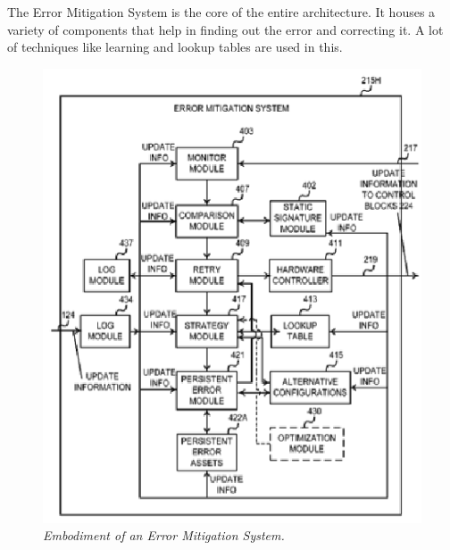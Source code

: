 The Error Mitigation System is the core of the entire architecture. It houses a variety of components that help in finding out the error and correcting it. A lot of techniques like learning and lookup tables are used in this.
	\begin{figure}[h]
		\begin{center}
			\includegraphics{figures/patent2_2.eps} 
			\caption{\small \sl Embodiment of an Error Mitigation System.\label{fig:Label4}} 
		\end{center} 
	\end{figure}

